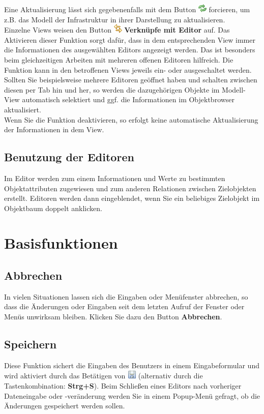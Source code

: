 \documentclass[a4paper,10pt]{book}
\begin{document}
Eine Aktualisierung lässt sich gegebenenfalls mit dem Button \includegraphics[height=2ex]{Icon/Aktualisieren.png} forcieren, um z.B. das Modell der Infrastruktur in ihrer Darstellung zu aktualisieren.
\newline\\
Einzelne Views weisen den Button \includegraphics[height=2ex]{Icon/Verinice_linked.png} \textbf{Verknüpfe mit Editor} auf.
Das Aktivieren dieser Funktion sorgt dafür, dass in dem entsprechenden View immer die Informationen des ausgewählten Editors
angezeigt werden. Das ist besonders beim gleichzeitigen Arbeiten mit mehreren offenen Editoren hilfreich. Die Funktion kann in
den betroffenen Views jeweils ein- oder ausgeschaltet werden. Sollten Sie beispielsweise mehrere Editoren geöffnet haben und
schalten zwischen diesen per Tab hin und her, so werden die dazugehörigen Objekte im Modell-View automatisch selektiert und
ggf. die Informationen im Objektbrowser aktualisiert.
\newline\\
Wenn Sie die Funktion deaktivieren, so erfolgt keine automatische Aktualisierung der Informationen in dem View.

\section{Benutzung der Editoren}
Im Editor werden zum einem Informationen und Werte zu bestimmten Objektattributen zugewiesen und zum anderen Relationen zwischen Zielobjekten erstellt.
Editoren werden dann eingeblendet, wenn Sie ein beliebiges Zielobjekt im Objektbaum doppelt anklicken.

\chapter{Basisfunktionen}
\section{Abbrechen}
In vielen Situationen lassen sich die Eingaben oder Menüfenster abbrechen, so dass die Änderungen oder Eingaben seit dem
letzten Aufruf der Fenster oder Menüs unwirksam bleiben. Klicken Sie dazu den Button \textbf{Abbrechen}.

\section{Speichern}
Diese Funktion sichert die Eingaben des Benutzers in einem Eingabeformular und wird aktiviert durch das Betätigen von \includegraphics[height=2ex]{Icon/Disk.png}
(alternativ durch die Tastenkombination: \textbf{Strg+S}). Beim Schließen eines
Editors nach vorheriger Dateneingabe oder \mbox{-veränderung} werden Sie in einem Popup-Menü gefragt, ob die Änderungen gespeichert werden sollen.
\end{document}
